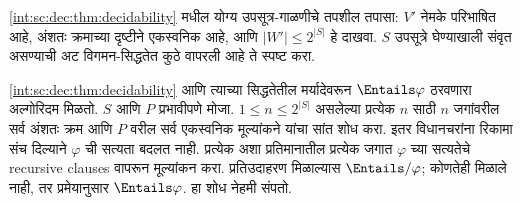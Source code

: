 \begin{prob}
\ref{int:sc:dec:thm:decidability} मधील योग्य
उपसूत्र-गाळणीचे तपशील तपासा: $V'$ नेमके परिभाषित आहे,
अंशतः क्रमाच्या दृष्टीने एकस्वनिक आहे, आणि $|W'|\leq2^{|S|}$
हे दाखवा. $S$ उपसूत्रे घेण्याखाली संवृत असण्याची अट
विगमन-सिद्धतेत कुठे वापरली आहे ते स्पष्ट करा.
\end{prob}

\ref{int:sc:dec:thm:decidability} आणि त्याच्या सिद्धतेतील
मर्यादेवरून $\Entails \varphi$ ठरवणारा अल्गोरिदम मिळतो.
$S$ आणि $P$ प्रभावीपणे मोजा. $1\leq n\leq2^{|S|}$
असलेल्या प्रत्येक $n$ साठी $n$ जगांवरील सर्व अंशतः क्रम
आणि $P$ वरील सर्व एकस्वनिक मूल्यांकने यांचा सांत शोध करा.
इतर विधानचरांना रिकामा संच दिल्याने $\varphi$ ची सत्यता बदलत नाही.
प्रत्येक अशा प्रतिमानातील प्रत्येक जगात $\varphi$ च्या सत्यतेचे
recursive clauses वापरून मूल्यांकन करा. प्रतिउदाहरण मिळाल्यास
$\Entails/ \varphi$; कोणतेही मिळाले नाही, तर प्रमेयानुसार
$\Entails \varphi$. हा शोध नेहमी संपतो.




